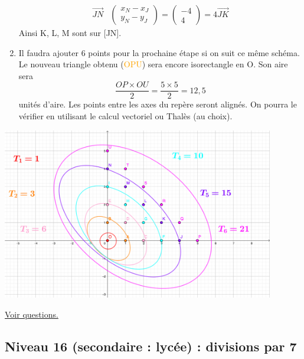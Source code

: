 \documentclass[11pt]{article}
\begin{document}
\begin{enumerate}
\begin{align*}
     \overrightarrow{JN}&\begin{pmatrix}x_N - x_J\\ y_N - y_J\end{pmatrix}=\begin{pmatrix}-4\\ 4\end{pmatrix} = 4\overrightarrow{JK}
\end{align*}
Ainsi K, L, M sont sur [JN].
\item Il faudra ajouter 6 points pour la prochaine étape si on suit ce
même schéma. Le nouveau triangle obtenu (\textcolor{orange}{OPU})
sera encore isorectangle en O.
Son aire sera  \[\dfrac{OP\times OU}{2} = \dfrac{5\times 5}{2} =
   12,5\] unités d'aire.
Les points entre les axes du repère seront alignés. On pourra le
vérifier en utilisant le calcul vectoriel ou Thalès (au choix).
\end{enumerate}

\newpage


\label{orga4f8b9c}
\begin{center}
\includegraphics[width=0.9\linewidth, height=7.5cm, keepaspectratio]{./images/nb-triangulaire.png}
\end{center}




\hyperref[org6596a55]{Voir questions.}

\newpage


\subsection{Niveau 16 (secondaire : lycée) : divisions par 7}
\label{sec:orgf49cfc1}

\label{org05889bb}
\end{document}
